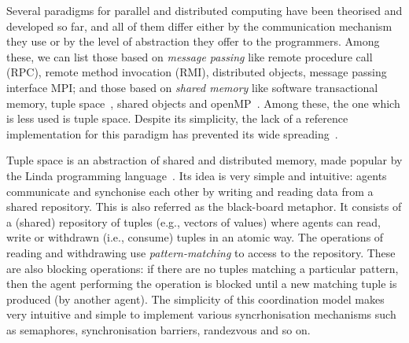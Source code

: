 
Several paradigms for parallel and distributed computing have been theorised and developed so far, and all of them differ either by the communication mechanism they use or by the level of abstraction they offer to the programmers. Among these, we can list those based on \emph{message passing} like remote procedure call (RPC), remote method invocation (RMI), distributed objects, message passing interface MPI; and those based on \emph{shared memory} like software transactional memory, tuple space~\cite{Gelernter85}, shared objects and  openMP~\cite{Mattson03}. Among these, the one which is less used is tuple space. Despite its simplicity, the lack of a reference implementation for this paradigm has prevented its wide spreading~\cite{BuravlevNM18}.


Tuple space is an abstraction of shared and distributed memory, made popular by the Linda programming language~\cite{Gelernter85}. Its idea is very simple and intuitive: agents communicate and synchonise each other by writing and reading data from a shared repository. This is also referred as the black-board metaphor. 
It consists of a (shared) repository of tuples (e.g., vectors of values) where agents can read, write or withdrawn (i.e., consume) tuples in an atomic way. 
The operations of reading and withdrawing use  \emph{pattern-matching} to access to the repository.
 These are also blocking operations:  if there are no tuples matching a particular pattern, then the agent performing the operation is blocked until a new matching tuple is produced (by another agent). The simplicity of this coordination model makes very intuitive and simple to implement various syncrhonisation mechanisms such as semaphores, synchronisation barriers, randezvous and so on.